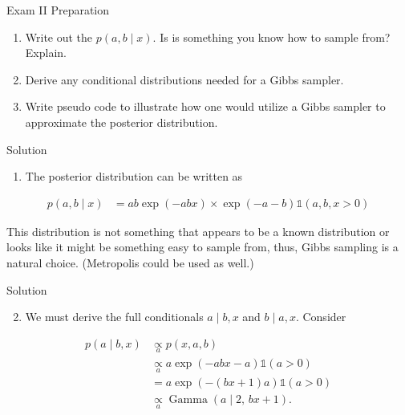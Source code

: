 \documentclass[
  ignorenonframetext,
]{beamer}
\providecommand{\tightlist}{%
  \setlength{\itemsep}{0pt}\setlength{\parskip}{0pt}}
\DeclareMathOperator*{\Ga}{Gamma}
\newcommand{\I}{\mathds{1}}
\begin{document}
\begin{frame}{Exam II Preparation}
\protect\hypertarget{exam-ii-preparation-1}{}

\begin{enumerate}
\tightlist
\item
  Write out the \(p(a,b \mid x).\) Is is something you know how to
  sample from? Explain.
\item
  Derive any conditional distributions needed for a Gibbs sampler.
\item
  Write pseudo code to illustrate how one would utilize a Gibbs sampler
  to approximate the posterior distribution.
\end{enumerate}

\end{frame}

\begin{frame}{Solution}
\protect\hypertarget{solution}{}

\begin{enumerate}
\tightlist
\item
  The posterior distribution can be written as
\end{enumerate}

\begin{align}
p(a,b \mid x)
& = a b \exp(- a b x)  \times \exp(- a - b)\I(a,b,x>0)
\end{align}

This distribution is not something that appears to be a known
distribution or looks like it might be something easy to sample from,
thus, Gibbs sampling is a natural choice. (Metropolis could be used as
well.)

\end{frame}

\begin{frame}{Solution}
\protect\hypertarget{solution-1}{}

\begin{enumerate}
\setcounter{enumi}{1}
\tightlist
\item
  We must derive the full conditionals \(a \mid b,x\) and
  \(b \mid a,x.\) Consider
\end{enumerate}

\begin{align}
    p(a \mid b,x)
    &\underset{a}{\propto} p(x,a,b) \\
    &\underset{a}{\propto} a \exp(-a b x - a)\I(a>0)  \\
    &= a \exp(-(b x + 1)a)\I(a>0)\\
    &\underset{a}{\propto} \Ga(a\mid 2,\, b x + 1).
\end{align}

\end{frame}
\end{document}
